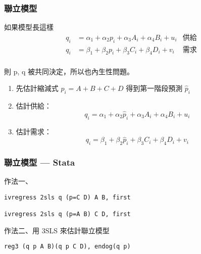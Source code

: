 \begin{frame}
    \frametitle{聯立模型}
    如果模型長這樣
    \begin{align*}
        q_i &= \alpha_1 + \alpha_2 p_i + \alpha_3 A_i + \alpha_4 B_i + u_i &\text{供給} \\
        q_i &= \beta_1 + \beta_2 p_i + \beta_3 C_i + \beta_4 D_i + v_i &\text{需求} \\
    \end{align*}
    
    則 p, q 被共同決定，所以也內生性問題。
    \begin{enumerate}
        \item 先估計縮減式 $p_i = A+B+C+D$ 得到第一階段預測 $\hat{p}_i$
        \item 估計供給：
        \begin{equation*}
            q_i = \alpha_1 + \alpha_2\hat{p}_i + \alpha_3 A_i + \alpha_4 B_i + u_i
        \end{equation*}
        \item 估計需求：
        \begin{equation*}
            q_i = \beta_1 + \beta_2 \hat{p}_i + \beta_3 C_i + \beta_4 D_i + v_i
         \end{equation*}
    \end{enumerate}
\end{frame}

\begin{frame}[fragile]
    \frametitle{聯立模型 --- Stata}
    
    作法一、
    \begin{lstlisting}
ivregress 2sls q (p=C D) A B, first

ivregress 2sls q (p=A B) C D, first \end{lstlisting}
    \vfill
    作法二、用 3SLS 來估計聯立模型
    \begin{lstlisting}
reg3 (q p A B)(q p C D), endog(q p)\end{lstlisting}   

\end{frame}
